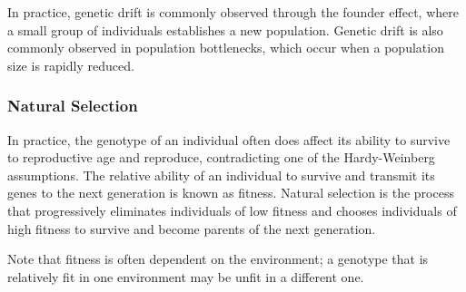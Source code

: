 \documentclass[12pt,titlepage]{article}
\begin{document}
        In practice, genetic drift is commonly observed through the founder effect, where a small group of individuals establishes a new population.
        Genetic drift is also commonly observed in population bottlenecks, which occur when a population size is rapidly reduced.

      \subsubsection{Natural Selection}
        In practice, the genotype of an individual often does affect its ability to survive to reproductive age and reproduce, contradicting one of the
        Hardy-Weinberg assumptions. The relative ability of an individual to survive and transmit its genes to the next generation is known as fitness.
        Natural selection is the process that progressively eliminates individuals of low fitness and chooses individuals of high fitness to survive
        and become parents of the next generation.

        Note that fitness is often dependent on the environment; a genotype that is relatively fit in one environment may be unfit in a different one.
\end{document}
